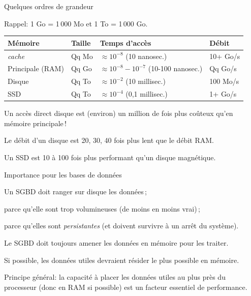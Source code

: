 \begin{frame}
{Quelques ordres de grandeur}

Rappel: 1 Go = 1\,000 Mo  et 1 To = 1\,000 Go.

\vfill

\begin{center}
\begin{small}
\begin{tabular}{l|l|l|l}
{\bf Mémoire} & {\bf Taille} & {\bf Temps d'accès} & {\bf Débit}\\
\hline
{\it cache} & Qq Mo &  $\approx 10^{-8}$ (10 nanosec.) & 10+ Go/s\\
Principale (RAM)  &  Qq Go &  $\approx 10^{-8} - 10^{-7}$ (10-100 nanosec.) & Qq Go/s \\
Disque  & Qq To &  $\approx 10^{-2}$ (10 millisec.) & 100 Mo/s\\
SSD & Qq To &  $\approx 10^{-4}$ (0,1 millisec.) & 1+ Go/s\\
\hline
\end{tabular}
\end{small}
\end{center}

\vfill
\begin{blocgauche}
Un accès \alert{direct} disque est (environ) un million de fois
plus coûteux qu'en mémoire principale\,!

\smallskip

Le débit d'un disque est 20, 30, 40 fois plus lent que le débit RAM.

\smallskip

Un SSD est 10 à  100 fois plus performant qu'un disque magnétique.
\end{blocgauche}

\end{frame}



\begin{frame}{Importance pour les bases de données}

 Un SGBD doit ranger sur disque les données\,;
\begin{redbullet}
   \item parce qu'elle sont trop volumineuses (de moins en moins vrai)\,;
   \item parce qu'elles sont \emph{persistantes} (et doivent survivre
      à un arrêt du système).
\end{redbullet}

\vfill
Le SGBD doit \alert{toujours} amener 
      les données en mémoire pour les traiter.

\vfill

Si possible, les \alert{données utiles} devraient résider
         le plus possible en mémoire.

\vfill

\begin{blocgauche}
\alert{Principe général}:
la capacité à placer les données \alert{utiles} au plus près du processeur (donc en RAM si possible)
est un facteur essentiel de performance.
\end{blocgauche}

\end{frame}

